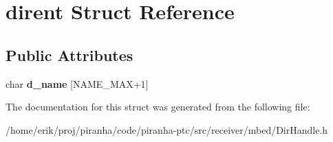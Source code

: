 \hypertarget{structdirent}{}\section{dirent Struct Reference}
\label{structdirent}
\subsection*{Public Attributes}
\begin{DoxyCompactItemize}
\item 
char {\bfseries d\+\_\+name} \mbox{[}N\+A\+M\+E\+\_\+\+M\+AX+1\mbox{]}\hypertarget{structdirent_a493ff210982a02728c1b177139bfdb47}{}\label{structdirent_a493ff210982a02728c1b177139bfdb47}

\end{DoxyCompactItemize}


The documentation for this struct was generated from the following file\+:\begin{DoxyCompactItemize}
\item 
/home/erik/proj/piranha/code/piranha-\/ptc/src/receiver/mbed/Dir\+Handle.\+h\end{DoxyCompactItemize}

